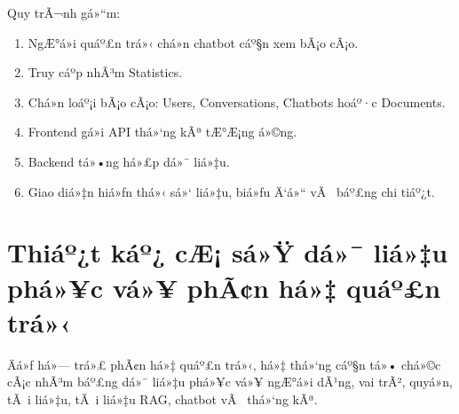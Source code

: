 ﻿\documentclass[12pt,a4paper]{report}
\begin{document}
Quy trÃ¬nh gá»“m:

\begin{enumerate}
    \item NgÆ°á»i quáº£n trá»‹ chá»n chatbot cáº§n xem bÃ¡o cÃ¡o.
    \item Truy cáº­p nhÃ³m Statistics.
    \item Chá»n loáº¡i bÃ¡o cÃ¡o: Users, Conversations, Chatbots hoáº·c Documents.
    \item Frontend gá»i API thá»‘ng kÃª tÆ°Æ¡ng á»©ng.
    \item Backend tá»•ng há»£p dá»¯ liá»‡u.
    \item Giao diá»‡n hiá»ƒn thá»‹ sá»‘ liá»‡u, biá»ƒu Ä‘á»“ vÃ  báº£ng chi tiáº¿t.
\end{enumerate}

\section{Thiáº¿t káº¿ cÆ¡ sá»Ÿ dá»¯ liá»‡u phá»¥c vá»¥ phÃ¢n há»‡ quáº£n trá»‹}

Äá»ƒ há»— trá»£ phÃ¢n há»‡ quáº£n trá»‹, há»‡ thá»‘ng cáº§n tá»• chá»©c cÃ¡c nhÃ³m báº£ng dá»¯ liá»‡u phá»¥c vá»¥ ngÆ°á»i dÃ¹ng, vai trÃ², quyá»n, tÃ i liá»‡u, tÃ i liá»‡u RAG, chatbot vÃ  thá»‘ng kÃª.
\end{document}
